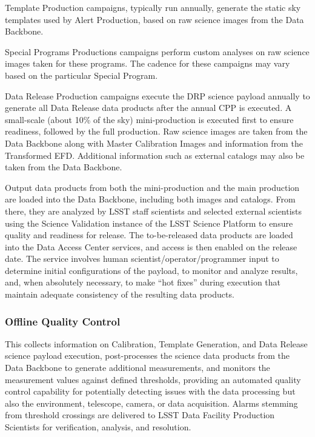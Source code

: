 \documentclass[DM,toc]{lsstdoc}
\begin{document}
Template Production campaigns, typically run annually, generate the static sky templates used by Alert Production, based on raw science images from the Data Backbone.

Special Programs Productions campaigns perform custom analyses on raw science images taken for these programs.
The cadence for these campaigns may vary based on the particular Special Program.

Data Release Production campaigns execute the DRP science payload annually to generate all
Data Release data products after the annual CPP is executed. A small-scale
(about 10\% of the sky) mini-production is executed first to ensure
readiness, followed by the full production. Raw science images are taken
from the Data Backbone along with Master Calibration Images and
information from the Transformed EFD. Additional information such as
external catalogs may also be taken from the Data Backbone.

Output data products from both the mini-production and the main
production are loaded into the Data Backbone, including both images and
catalogs. From there, they are analyzed by LSST staff scientists and
selected external scientists using the Science Validation instance of
the LSST Science Platform to ensure quality and readiness for release.
The to-be-released data products are loaded into the Data Access Center
services, and access is then enabled on the release date. The service
involves human scientist/operator/programmer input to determine initial
configurations of the payload, to monitor and analyze results, and, when
absolutely necessary, to make ``hot fixes'' during execution that
maintain adequate consistency of the resulting data products.

\subsubsection{Offline Quality Control}\label{offline-quality-control}

This collects information on Calibration, Template Generation, and Data Release science payload execution,
post-processes the science data products from the Data Backbone to
generate additional measurements, and monitors the measurement values
against defined thresholds, providing an automated quality control
capability for potentially detecting issues with the data processing but
also the environment, telescope, camera, or data acquisition. Alarms
stemming from threshold crossings are delivered to LSST Data Facility
Production Scientists for verification, analysis, and resolution.
\end{document}
